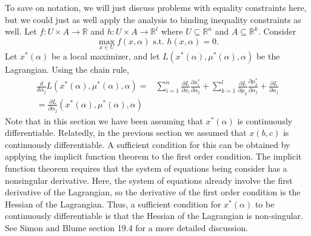\documentclass[12pt,reqno]{amsart}
\theoremstyle{definition}
\def\R{\mathbb{R}}
\renewcommand{\to}{{\rightarrow}}
\begin{document}
To save on notation, we will just discuss problems with equality
constraints here, but we could just as well apply the analysis to
binding inequality constraints as well. 
Let $f:U \times A \to \R$ and $h:U \times A \to \R^l$ where $U
\subseteq \R^n$ and $A \subseteq \R^k$. Consider
\[ \max_{x \in U} f(x,\alpha) \text{ s.t. } h(x,\alpha) = 0. \]
Let $x^*(\alpha)$ be a local maximizer, and let
$L(x^*(\alpha),\mu^*(\alpha),\alpha)$ be the Lagrangian. Using the
chain rule, 
\begin{align*}
  \frac{d}{d \alpha_j} L(x^*(\alpha),\mu^*(\alpha),\alpha) = & \sum_{i=1}^n
  \frac{\partial L}{\partial x_i} \frac{\partial x_i^*}{\partial
    \alpha_j} + \sum_{k=1}^l\frac{\partial L}{\partial
    \mu_k} \frac{\partial \mu_k^*}{\partial 
    \alpha_j}   + \frac{\partial L}{\partial \alpha_j } \\
  = \frac{\partial L}{\partial \alpha_j
  }(x^*(\alpha),\mu^*(\alpha),\alpha) 
\end{align*}
Note that in this section we have been assuming that $x^*(\alpha)$ is
continuously differentiable. Relatedly, in the previous section we
assumed that $x(b,c)$ is continuously differentiable. A sufficient
condition for this can be obtained by applying the implicit function
theorem to the first order condition. The implicit function theorem
requires that the system of equations being consider has a nonsingular
derivative. Here, the system of equations already involve the first
derivative of the Lagrangian, so the derivative of the first order
condition is the Hessian of the Lagrangian. Thus, a sufficient
condition for $x^*(\alpha)$ to be continuously differentiable is that
the Hessian of the Lagrangian is non-singular. See Simon and Blume
section 19.4 for a more detailed discussion. 



\end{document}
